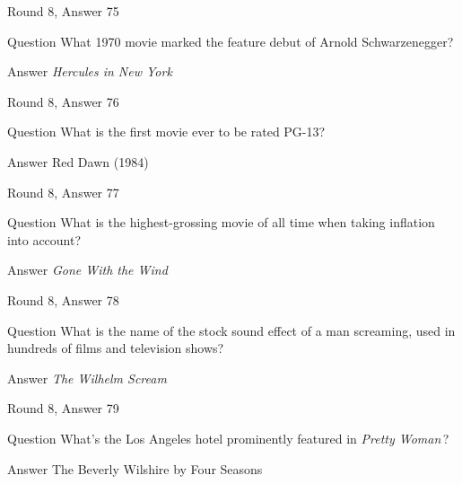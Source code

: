 \documentclass[11pt]{beamer}
\begin{document}
\begin{frame}[t]{Round 8, Answer 75}
\vspace{2em}
\begin{block}{Question}
What 1970 movie marked the feature debut of Arnold Schwarzenegger?
\end{block}
\pause{}
\begin{block}{Answer}
\emph{Hercules in New York}
\end{block}
\end{frame}
    

\begin{frame}[t]{Round 8, Answer 76}
\vspace{2em}
\begin{block}{Question}
What is the first movie ever to be rated PG-13?
\end{block}
\pause{}
\begin{block}{Answer}
Red Dawn (1984)
\end{block}
\end{frame}
    

\begin{frame}[t]{Round 8, Answer 77}
\vspace{2em}
\begin{block}{Question}
What is the highest-grossing movie of all time when taking inflation into account?
\end{block}
\pause{}
\begin{block}{Answer}
\emph{Gone With the Wind}
\end{block}
\end{frame}
    

\begin{frame}[t]{Round 8, Answer 78}
\vspace{2em}
\begin{block}{Question}
What is the name of the stock sound effect of a man screaming, used in hundreds of films and television shows?
\end{block}
\pause{}
\begin{block}{Answer}
\emph{The Wilhelm Scream}
\end{block}
\end{frame}
    

\begin{frame}[t]{Round 8, Answer 79}
\vspace{2em}
\begin{block}{Question}
What's the Los Angeles hotel prominently featured in \emph{Pretty Woman}\,?
\end{block}
\pause{}
\begin{block}{Answer}
The Beverly Wilshire by Four Seasons
\end{block}
\end{frame}
    
\end{document}
